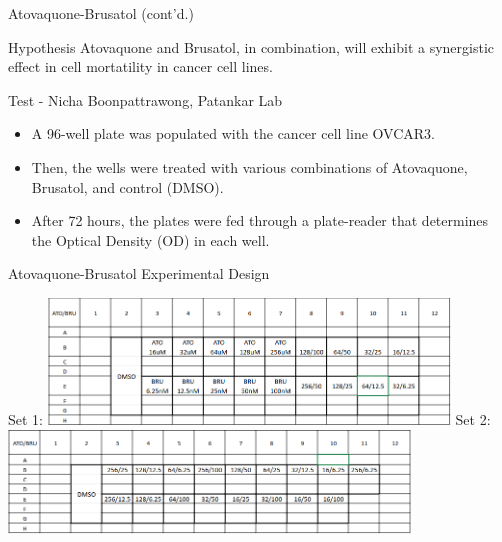 \documentclass{beamer}
\begin{document}
\begin{frame}{Atovaquone-Brusatol (cont'd.)}

    \begin{block}{Hypothesis}
        Atovaquone and Brusatol, in combination, will exhibit a synergistic effect in cell mortatility in cancer cell lines.
    \end{block}

    \vfill
    \begin{block}{Test - Nicha Boonpattrawong, Patankar Lab}
        \begin{itemize}
            \item A 96-well plate was populated with the cancer cell line OVCAR3.
            \item Then, the wells were treated with various combinations of Atovaquone, Brusatol, and control (DMSO).
            \item After 72 hours, the plates were fed through a plate-reader that determines the Optical Density (OD) in each well.
        \end{itemize}
    \end{block}

\end{frame}

\begin{frame}{Atovaquone-Brusatol Experimental Design}
    \begin{center}
        Set 1: \includegraphics[width=0.8\textwidth, height=0.4\textheight]{figs/set1.png}
        \vfill
        Set 2: \includegraphics[width=0.8\textwidth, height=0.4\textheight]{figs/set2.png}
    \end{center}
\end{frame}
\end{document}

